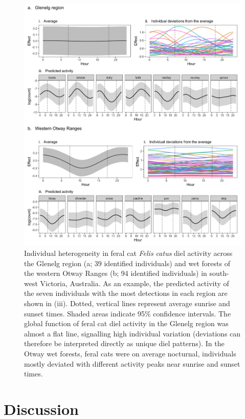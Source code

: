 \documentclass[11pt,a4paper,titlepage,twoside,openright]{style/unimelbthesis}
\begin{document}
\begin{mainmatter}
\begin{figure}
{\centering \includegraphics[width=1\linewidth]{figure/cat_ind} 

}

\caption{Individual heterogeneity in feral cat \textit{Felis catus} diel activity across the Glenelg region (a; 39 identified individuals) and wet forests of the western Otway Ranges (b; 94 identified individuals) in south-west Victoria, Australia. As an example, the predicted activity of the seven individuals with the most detections in each region are shown in (iii). Dotted, vertical lines represent average sunrise and sunset times. Shaded areas indicate 95\% confidence intervals. The global function of feral cat diel activity in the Glenelg region was almost a flat line, signalling high individual variation (deviations can therefore be interpreted directly as unique diel patterns). In the Otway wet forests, feral cats were on average nocturnal, individuals mostly deviated with different activity peaks near sunrise and sunset times.}\label{fig:diel-individuals}
\end{figure}
\newpage

\hypertarget{discussion-3}{%
\section{Discussion}\label{discussion-3}}


\end{mainmatter}
\end{document}
